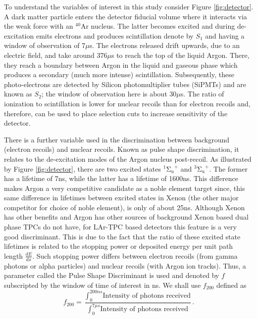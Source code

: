 \documentclass[11pt]{article} %
\begin{document}
\par To understand the variables of interest in this study consider Figure \ref{fig:detector}.
A dark matter particle enters the detector fiducial volume where it interacts via the weak force with an $^{40}\mathrm{\text{Ar}}$ nucleus.
The latter becomes excited and during de-excitation emits electrons and produces scintillation denote by $S_1$ and having a window of observation of 7$\mu$s.
The electrons released drift upwards, due to an electric field, and take around 376$\mu$s to reach the top of the liquid Argon.
There, they reach a boundary between Argon in the liquid and gaseous phase which produces a secondary (much more intense) scintillation.
Subsequently, these photo-electrons are detected by Silicon photomultiplier tubes (SiPMTs) and are known as $S_2$;
the window of observation here is about 30$\mu$s.
The ratio of ionization to scintillation is lower for nuclear recoils
 than for electron recoils and, therefore, can be used to place selection cuts to increase sensitivity of the detector.
\\
\par There is a further variable used in the discrimination between background (electron recoils) and nuclear recoils.
Known as pulse shape discrimination, it relates to the de-excitation modes of the Argon nucleus post-recoil.
As illustrated by Figure \ref{fig:detector}, there are two excited states $^{1}\mathrm{{\Sigma_{u}}^{+}}$ and $^{3}\mathrm{{\Sigma_{u}}^{+}}$.
The former has a lifetime of 7ns, while the latter has a lifetime of 1600ns.
This difference makes Argon a very competitive candidate as a noble element target since, this same difference in lifetimes between
excited states in Xenon (the other major competitor for choice of noble element), is only of about 25ns.
Although Xenon has other benefits and Argon has other sources of background Xenon based dual phase TPCs do not have, for LAr-TPC based
detectors this feature is a very good discriminant.
This is due to the fact that the ratio of these excited state lifetimes is related to the stopping power or deposited energy per unit path length
$\frac{dE}{dx}$.
Such stopping power differs between electron recoils (from gamma photons or alpha particles) and
nuclear recoils (with Argon ion tracks).
Thus, a parameter called the Pulse Shape Discriminant is used and denoted by $f$ subscripted by the window of time of interest in ns.
We shall use $f_{200}$ defined as
\begin{equation}
f_{200}=\frac{\int_{0}^{200ns}\text{Intensity of photons received}}{\int_{0}^{7\mu s}\text{Intensity of photons received}}.
\end{equation}
\end{document}
